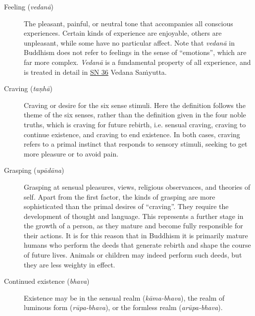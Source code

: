 \documentclass[12pt,openany]{book}%
\begin{document}
\begin{description}
\item[Feeling (\textit{\textsanskrit{vedanā}})] The pleasant, painful, or neutral tone that accompanies all conscious experiences.
Certain kinds of experience are enjoyable, others are unpleasant, while some have no particular affect. Note that \textit{\textsanskrit{vedanā}} in Buddhism does not refer to feelings in the sense of “emotions”, which are far more complex. \textit{\textsanskrit{Vedanā}} is a fundamental property of all experience, and is treated in detail in \href{https://suttacentral.net/sn36}{SN 36} Vedana \textsanskrit{Saṁyutta}.%
\item[Craving (\textit{\textsanskrit{taṇhā}})] Craving or desire for the six sense stimuli.
Here the definition follows the theme of the six senses, rather than the definition given in the four noble truths, which is craving for future rebirth, i.e. sensual craving, craving to continue existence, and craving to end existence. In both cases, craving refers to a primal instinct that responds to sensory stimuli, seeking to get more pleasure or to avoid pain.%
\item[Grasping (\textit{\textsanskrit{upādāna}})] Grasping at sensual pleasures, views, religious observances, and theories of self.
Apart from the first factor, the kinds of grasping are more sophisticated than the primal desires of “craving”. They require the development of thought and language. This represents a further stage in the growth of a person, as they mature and become fully responsible for their actions. It is for this reason that in Buddhism it is primarily mature humans who perform the deeds that generate rebirth and shape the course of future lives. Animals or children may indeed perform such deeds, but they are less weighty in effect.%
\item[Continued existence (\textit{bhava})] Existence may be in the sensual realm (\textit{\textsanskrit{kāma}-bhava}), the realm of luminous form (\textit{\textsanskrit{rūpa}-bhava}), or the formless realm (\textit{\textsanskrit{arūpa}-bhava}).

\end{description}
\end{document}
